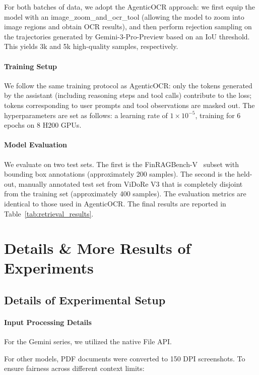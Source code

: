 \documentclass[]{opendatalab}
\begin{document}
{{{For both batches of data, we adopt the AgenticOCR approach: we first equip the model with an image\_zoom\_and\_ocr\_tool (allowing the model to zoom into image regions and obtain OCR results), and then perform rejection sampling on the trajectories generated by Gemini-3-Pro-Preview based on an IoU threshold. This yields 3k and 5k high-quality samples, respectively.

\paragraph{Training Setup} We follow the same training protocol as AgenticOCR: only the tokens generated by the assistant (including reasoning steps and tool calls) contribute to the loss; tokens corresponding to user prompts and tool observations are masked out. The hyperparameters are set as follows: a learning rate of \(1 \times 10^{-5}\), training for 6 epochs on 8 H200 GPUs.

\paragraph{Model Evaluation} We evaluate on two test sets. The first is the FinRAGBench-V~\citep{zhao-etal-2025-finragbench} subset with bounding box annotations (approximately 200 samples). The second is the held-out, manually annotated test set from ViDoRe V3 that is completely disjoint from the training set (approximately 400 samples). The evaluation metrics are identical to those used in AgenticOCR. The final results are reported in Table~\ref{tab:retrieval_results}.


\newpage
\section{Details \& More Results of Experiments}
\label{Details & More Results of Experiments}
\subsection{Details of Experimental Setup}
\label{Appendix: Details of Experiments}
\paragraph{Input Processing Details} For the Gemini series, we utilized the native File API.

For other models, PDF documents were converted to 150 DPI screenshots. To ensure fairness across different context limits:

}}}
\end{document}
